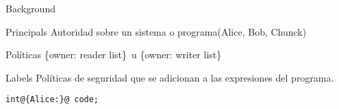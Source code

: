 \begin{frame}[fragile]{Background}
	\begin{block}{Principals}
		Autoridad sobre un sistema o programa(Alice, Bob, Chunck)
	\end{block}
	\pause
	\begin{block}{Políticas}
		\{owner: reader list\}\ u \{owner: writer list\}
	\end{block}
	\pause
	\begin{block}{Labels} 
		Políticas de seguridad que se adicionan a las expresiones del programa.
		\begin{lstlisting}[style=base]
			int@{Alice:}@ code;
		\end{lstlisting}
	\end{block}
\end{frame}